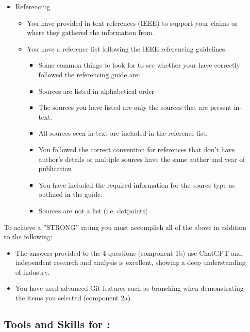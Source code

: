 \documentclass[a4paper, 11pt]{report}
\begin{document}
\begin{itemize}
\begin{itemize}
\begin{itemize}
		\end{itemize}
	\end{itemize}
\item Referencing
	\begin {itemize}
	\item You have provided in-text references (IEEE) to support your claims or where they gathered the information from.
	\item You have a reference list following the IEEE referencing guidelines.
		\begin{itemize}
		\item Some common things to look for to see whether your have correctly followed the referencing guide are:
		\item Sources are listed in alphabetical order
		\item The sources you have listed are only the sources that are present in-text.
		\item All sources seen in-text are included in the reference list.
		\item You followed the correct convention for references that don’t have author’s details or multiple sources have the same author and year of publication
		\item You have included the required information for the source type as outlined in the guide.
		\item Sources are not a list (i.e. dotpoints)
		\end{itemize}
	\end{itemize}
\end{itemize}

To achieve a ''STRONG'' rating you must accomplish all of the above in addition to the following:
\begin{itemize}
\item The answers provided to the 4 questions (component 1b) use ChatGPT and independent research and analysis is excellent, showing a deep understanding of industry.
\item You have used advanced Git features such as branching when demonstrating the items you selected (component 2a).
\end{itemize}




\subsection{Tools and Skills for \majA: \studA}
\end{document}
